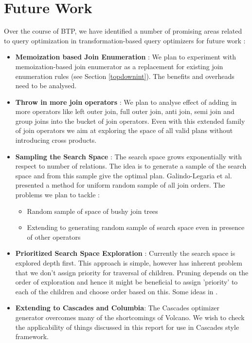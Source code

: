 \chapter{Future Work}
Over the course of BTP, we have identified a number of promising areas related to query optimization in transformation-based query optimizers for future work :
\begin{itemize}
	\item \textbf{Memoization based Join Enumeration} : We plan to experiment with memoization-based join enumerator as a replacement for existing join enumeration rules (see Section \ref{topdownint}). The benefits and overheads need to be analysed.
	\item \textbf{Throw in more join operators} : We plan to analyse effect of adding in more operators like left outer join, full outer join, anti join, semi join and group joins into the bucket of join operators. Even with this extended family of join operators we aim at exploring the space of all valid plans without introducing cross products. 
	\item \textbf{Sampling the Search Space} : The search space grows exponentially with respect to number of relations. The idea is to generate a sample of the search space and from this sample give the optimal plan. Galindo-Legaria et al. \cite{galindo1995uniformly} presented a method for uniform random sample of all join orders. The problems we plan to tackle :
	\begin{itemize}
		\item Random sample of space of bushy join trees
		\item Extending to generating random sample of search space even in presence of other operators
	\end{itemize}
	\item \textbf{Prioritized Search Space Exploration} : Currently the search space is explored depth first. This approach is simple, however has inherent problem that we don't assign priority for traversal of children. Pruning depends on the order of exploration and hence it might be beneficial to assign 'priority' to each of the children and choose order based on this. Some ideas in \cite{fender2012effective}.	
	\item \textbf{Extending to Cascades and Columbia}: The Cascades optimizer generator overcomes many of the shortcomings of Volcano. We wish to check the applicability of things discussed in this report for use in Cascades style framework.	
\end{itemize}